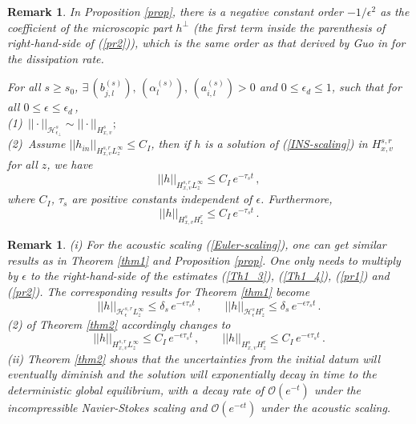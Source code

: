 \documentclass[final,onefignum,onetabnum]{siamart171218}
\newtheorem{remark}[theorem]{Remark}
\begin{document}
\begin{remark}
In Proposition \ref{prop}, there is a negative constant order $-1/\epsilon^2$ as the coefficient of the microscopic part $h^{\perp}$ (the first term inside the parenthesis of right-hand-side of (\ref{pr2})), which is the same order as that
derived by Guo in \cite{Guo-NS} for the dissipation rate. 
\begin{theorem}
\label{thm2}
For all $s\geq s_0$, $\exists\, (b_{j,l}^{(s)}), \, (\alpha_l^{(s)}), \, (a_{i,l}^{(s)})>0$ and $0\leq \epsilon_d\leq 1$, such that
for all $0\leq \epsilon\leq \epsilon_d$\,, \\
(1)\, $||\cdot||_{\mathcal H_{\epsilon_{\perp}}^s}\sim ||\cdot||_{H_{x,v}^s} ;$\\
(2)\, Assume  $||h_{in}||_{H_{x,v}^{s,r}L_z^{\infty}} \leq C_{I}$, then if $h$ is a solution of (\ref{INS-scaling}) in
$H_{x,v}^{s,r}$ for all $z$, we have
\begin{equation}\label{thm2_1} ||h||_{H_{x,v}^{s,r} L_z^{\infty}}\leq C_{I}\, e^{-\tau_s t}\,, \end{equation}
where $C_I$, $\tau_s$ are positive constants independent of $\epsilon$. Furthermore,
\begin{equation}\label{thm2_2} ||h||_{H_{x,v}^{s} H_z^r} \leq  C_{I}\, e^{-\tau_s t}\,. \end{equation}
\end{theorem}
\end{remark}
\begin{remark}
(i) For the acoustic scaling (\ref{Euler-scaling}), one can get similar
results as in Theorem \ref{thm1} and Proposition \ref{prop}. 
One only needs to multiply by $\epsilon$ to the right-hand-side of the estimates (\ref{Th1_3}), (\ref{Th1_4}),
(\ref{pr1}) and (\ref{pr2}). The corresponding results for Theorem \ref{thm1} become 
$$||h||_{\mathcal H_{\epsilon}^{s,r}L_z^{\infty}} \leq \delta_s\, e^{-\epsilon\tau_s t}\,, \qquad
 ||h||_{\mathcal H_{\epsilon}^s H_z^r} \leq \delta_s\, e^{-\epsilon\tau_s t}\,.$$
(2) of Theorem \ref{thm2} accordingly changes to
$$||h||_{H_{x,v}^{s,r} L_z^{\infty}}\leq C_I\, e^{-\epsilon\tau_s t}\,, \qquad
||h||_{H_{x,v}^{s} H_z^r} \leq C_I\,  e^{-\epsilon\tau_s t}\,.$$
(ii) Theorem \ref{thm2} shows that the uncertainties from the initial datum will eventually diminish and the solution will
exponentially decay in time to the deterministic global equilibrium, 
with a decay rate of $\mathcal O(e^{-t})$ under the incompressible Navier-Stokes scaling and
$\mathcal O(e^{-\epsilon t})$ under the acoustic scaling.
\end{remark}
\end{document}
